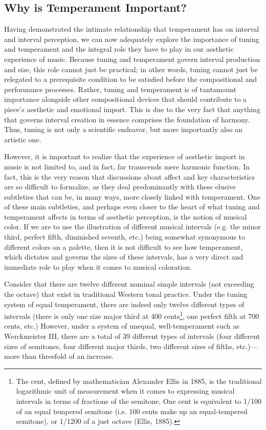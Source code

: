 \subsection{Why is Temperament
Important?}\label{why-is-temperament-important}

Having demonstrated the intimate relationship that temperament has on
interval and interval perception, we can now adequately explore the
importance of tuning and temperament and the integral role they have to
play in our aesthetic experience of music. Because tuning and
temperament govern interval production and size, this role cannot just
be practical; in other words, tuning cannot just be relegated to a
prerequisite condition to be satisfied before the compositional and
performance processes. Rather, tuning and temperament is of tantamount
importance alongside other compositional devices that should contribute
to a piece's aesthetic and emotional import. This is due to the very
fact that anything that governs interval creation in essence comprises
the foundation of harmony. Thus, tuning is not only a scientific
endeavor, but more importantly also an artistic one.

However, it is important to realize that the experience of aesthetic
import in music is not limited to, and in fact, far transcends mere
harmonic function. In fact, this is the very reason that discussions
about affect and key characteristics are so difficult to formalize, as
they deal predominantly with these elusive subtleties that can be, in
many ways, more closely linked with temperament. One of these main
subtleties, and perhaps even closer to the heart of what tuning and
temperament affects in terms of aesthetic perception, is the notion of
musical color. If we are to use the illustration of different musical
intervals (e.g. the minor third, perfect fifth, diminished seventh,
etc.) being somewhat synonymous to different colors on a palette, then
it is not difficult to see how temperament, which dictates and governs
the sizes of these intervals, has a very direct and immediate role to
play when it comes to musical coloration.

Consider that there are twelve different nominal simple intervals (not
exceeding the octave) that exist in traditional Western tonal practice.
Under the tuning system of equal temperament, there are indeed only
twelve different types of intervals (there is only one size major third
at 400
cents\footnote{The cent, defined by mathematician Alexander Ellis in 1885, is the traditional logarithmic unit of measurement when it comes to expressing musical intervals in terms of fractions of the semitone. One cent is equivalent to 1/100 of an equal tempered semitone (i.e. 100 cents make up an equal-tempered semitone), or 1/1200 of a just octave (Ellis, 1885).},
one perfect fifth at 700 cents, etc.) However, under a system of
unequal, well-temperament such as Werckmeister III, there are a total of
39 different types of intervals (four different sizes of semitones, four
different major thirds, two different sizes of fifths, etc.)---more than
threefold of an increase.

